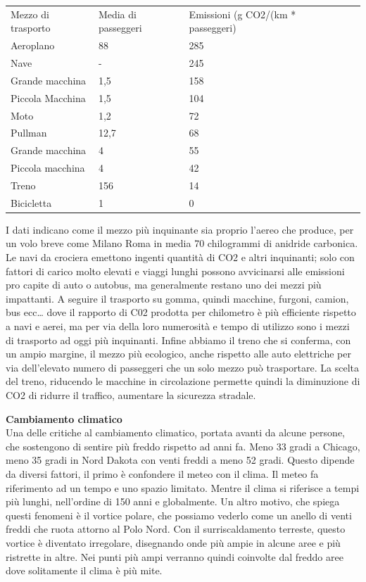 \documentclass[12pt]{book} %
\begin{document}
\begin{table}[]
\begin{tabular}{lllll}
Mezzo di trasporto & Media di passeggeri & Emissioni (g CO2/(km * passeggeri) & & \\
Aeroplano & 88 & 285 & & \\
Nave & - & 245 & & \\
Grande macchina & 1,5 & 158 & & \\
Piccola Macchina & 1,5 & 104 & & \\
Moto & 1,2 & 72 & & \\
Pullman & 12,7 & 68 & & \\
Grande macchina & 4 & 55 & & \\
Piccola macchina & 4 & 42 & & \\
Treno & 156 & 14 & & \\
Bicicletta & 1 & 0 & & 
\end{tabular}
\end{table}

I dati indicano come il mezzo più
inquinante sia proprio l'aereo che produce, per un volo breve come Milano Roma in media 70
chilogrammi di anidride carbonica. Le navi da crociera emettono ingenti quantità di CO2 e altri inquinanti; solo con fattori di carico molto elevati e viaggi lunghi possono avvicinarsi alle emissioni pro capite di auto o autobus, ma generalmente restano uno dei mezzi più impattanti. A seguire il trasporto
su gomma, quindi macchine, furgoni, camion, bus ecc… dove il rapporto di C02 prodotta per chilometro è più efficiente rispetto a navi e aerei, ma per via della loro numerosità e tempo di utilizzo sono i mezzi di trasporto ad
oggi più inquinanti. Infine abbiamo il treno che si conferma, con un ampio margine, il mezzo più ecologico, anche
rispetto alle auto elettriche per via dell'elevato numero di passeggeri che un solo mezzo può
trasportare. 
La scelta del treno, riducendo le macchine in circolazione permette quindi la diminuzione di CO2 di ridurre il
traffico, aumentare la sicurezza stradale.

\noindent \textbf{\large Cambiamento climatico} \\
Una delle critiche al cambiamento climatico, portata avanti da alcune persone, che sostengono di sentire più freddo rispetto ad anni fa. 
Meno 33 gradi a Chicago, meno 35 gradi in Nord
Dakota con venti freddi a meno 52 gradi. Questo dipende da diversi fattori, il primo è confondere il meteo con il clima. Il meteo fa riferimento ad un tempo e uno spazio limitato. Mentre il clima si riferisce a tempi più lunghi,
nell'ordine di 150 anni e globalmente. Un altro motivo, che spiega questi fenomeni è il vortice polare, che possiamo vederlo come
un anello di venti freddi che ruota attorno al Polo Nord. Con il surriscaldamento terreste, questo vortice è diventato
irregolare, disegnando onde più ampie in alcune aree e più ristrette in altre. Nei punti più ampi verranno quindi
coinvolte dal freddo aree dove solitamente il clima è più mite. 
\end{document}
